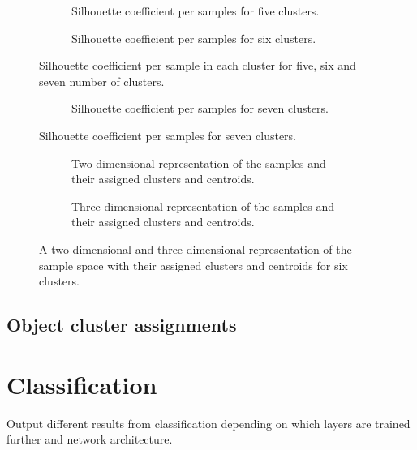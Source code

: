 \begin{figure}
	\begin{subfigure}[b]{\textwidth}
		
		\caption{Silhouette coefficient per samples for five clusters.}
	\end{subfigure}
	\begin{subfigure}[b]{\textwidth}
		
		\caption{Silhouette coefficient per samples for six clusters.}
	\end{subfigure}
	\caption{Silhouette coefficient per sample in each cluster for five, six and seven number of clusters.}
\end{figure}
\begin{figure}
	\ContinuedFloat
	\begin{subfigure}[b]{\textwidth}
		
		\caption{Silhouette coefficient per samples for seven clusters.}
	\end{subfigure}
\end{figure}


\begin{figure}
	\begin{subfigure}[b]{\textwidth}
		
		\caption{Two-dimensional representation of the samples and their assigned clusters and centroids.}
	\end{subfigure}
	\begin{subfigure}[b]{\textwidth}
		
		\caption{Three-dimensional representation of the samples and their assigned clusters and centroids.}
	\end{subfigure}
	\caption{A two-dimensional and three-dimensional representation of the sample space with their assigned clusters and centroids for six clusters.}
\end{figure}


\subsection{Object cluster assignments}



%

\section{Classification}
Output different results from classification depending on which layers are trained further and network architecture.

